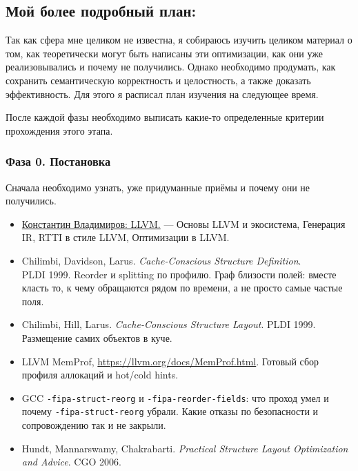 \documentclass[a4paper,12pt]{article}
\begin{document}
\subsection{Мой более подробный план:}

Так как сфера мне целиком не известна, я собираюсь изучить
целиком материал о том, как теоретически могут быть написаны эти оптимизации,
как они уже реализовывались и почему не получились. Однако необходимо
продумать, как сохранить семантическую корректность и целостность, а также
доказать эффективность. Для этого я расписал план изучения на следующее время.

После каждой фазы необходимо выписать какие-то определенные критерии прохождения
этого этапа.
\subsubsection{Фаза 0. Постановка}

Сначала необходимо узнать, уже придуманные приёмы и почему они не получились.

\begin{itemize}
    \item
        \href{https://sourceforge.net/projects/cpp-lects-rus/files/cpp-graduate/16-llvm.pdf/download}{Константин
        Владимиров: LLVM.} --- Основы LLVM и экосистема, Генерация IR, RTTI в стиле 
        LLVM, Оптимизации в LLVM.

    \item Chilimbi, Davidson, Larus. \textit{Cache-Conscious
    Structure Definition}. \\
    PLDI 1999. Reorder и splitting по профилю. Граф
    близости полей: вместе класть то, к чему обращаются рядом по
    времени, а не просто самые частые поля.
    \item Chilimbi, Hill, Larus. \textit{Cache-Conscious Structure
    Layout}. PLDI 1999. Размещение самих объектов в куче.
    \item LLVM MemProf, \url{https://llvm.org/docs/MemProf.html}.
    Готовый сбор профиля аллокаций и hot/cold hints. 
    \item GCC \texttt{-fipa-struct-reorg} и
    \texttt{-fipa-reorder-fields}: что проход умел и почему
    \texttt{-fipa-struct-reorg} убрали. Какие отказы по безопасности
    и сопровождению так и не закрыли. 
    \item Hundt, Mannarswamy, Chakrabarti. \textit{Practical Structure
    Layout Optimization and Advice}. CGO 2006. 
\end{itemize}
\end{document}
